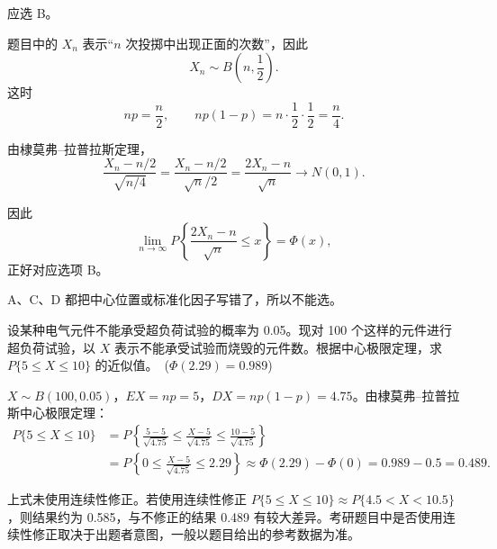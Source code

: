 ﻿\documentclass[lang=cn,11pt]{elegantbook}
\begin{document}
\begin{solution}
应选 B。

题目中的 \(X_n\) 表示“\(n\) 次投掷中出现正面的次数”，因此
\[
X_n\sim B\!\left(n,\frac12\right).
\]
这时
\[
np=\frac n2,\qquad np(1-p)=n\cdot \frac12\cdot \frac12=\frac n4.
\]

由棣莫弗--拉普拉斯定理，
\[
\frac{X_n - n/2}{\sqrt{n/4}} = \frac{X_n - n/2}{\sqrt{n}/2} = \frac{2X_n - n}{\sqrt{n}} \to N(0,1).
\]

因此
\[
\lim_{n\to\infty} P\!\left\{\frac{2X_n-n}{\sqrt n}\le x\right\}=\Phi(x),
\]
正好对应选项 B。

A、C、D 都把中心位置或标准化因子写错了，所以不能选。
\end{solution}


\begin{exercise}\label{exer:5-dml-burn}
设某种电气元件不能承受超负荷试验的概率为 0.05。现对 100 个这样的元件进行超负荷试验，以 \(X\) 表示不能承受试验而烧毁的元件数。根据中心极限定理，求 \(P\{5 \leq X \leq 10\}\) 的近似值。\ (\(\Phi(2.29) = 0.989\))
\end{exercise}
\begin{solution}
\(X \sim B(100, 0.05)\)，\(EX = np = 5\)，\(DX = np(1-p) = 4.75\)。由棣莫弗--拉普拉斯中心极限定理：
\[
\begin{aligned}
P\{5 \leq X \leq 10\}
&= P\!\left\{\frac{5 - 5}{\sqrt{4.75}} \leq \frac{X - 5}{\sqrt{4.75}} \leq \frac{10 - 5}{\sqrt{4.75}}\right\} \\
&= P\!\left\{0 \leq \frac{X - 5}{\sqrt{4.75}} \leq 2.29\right\}
\approx \Phi(2.29) - \Phi(0) = 0.989 - 0.5 = 0.489.
\end{aligned}
\]
\end{solution}

\begin{note}
上式未使用连续性修正。若使用连续性修正 \(P\{5 \leq X \leq 10\} \approx P\{4.5 < X < 10.5\}\)，则结果约为 0.585，与不修正的结果 0.489 有较大差异。考研题目中是否使用连续性修正取决于出题者意图，一般以题目给出的参考数据为准。
\end{note}
\end{document}
